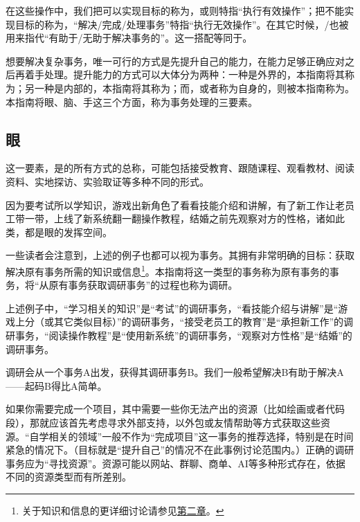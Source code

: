在这些操作中，我们把可以实现目标的称为，或则特指“执行有效操作”；把不能实现目标的称为，“解决/完成/处理事务”特指“执行无效操作”。在其它时候，/也被用来指代“有助于/无助于解决事务的”。这一搭配等同于。

想要解决复杂事务，唯一可行的方式是先提升自己的能力，在能力足够正确应对之后再着手处理。提升能力的方式可以大体分为两种：一种是外界的，本指南将其称为；另一种是内部的，本指南将其称为；而，或者称为自身的，则被本指南称为。本指南将眼、脑、手这三个方面，称为事务处理的三要素。

\subsection{眼}
这一要素，是的所有方式的总称，可能包括接受教育、跟随课程、观看教材、阅读资料、实地探访、实验取证等多种不同的形式。
\begin{examples}
因为要考试所以学知识，游戏出新角色了看看技能介绍和讲解，有了新工作让老员工带一带，上线了新系统翻一翻操作教程，结婚之前先观察对方的性格，诸如此类，都是眼的发挥空间。
\end{examples}
一些读者会注意到，上述的例子也都可以视为事务。其拥有非常明确的目标：获取解决原有事务所需的知识或信息\footnote{关于知识和信息的更详细讨论请参见\hyperref[sec:知识与信息]{第二章}。}。本指南将这一类型的事务称为原有事务的事务，将“从原有事务获取调研事务”的过程也称为调研。
\begin{examples}
上述例子中，“学习相关的知识”是“考试”的调研事务，“看技能介绍与讲解”是“游戏上分（或其它类似目标）”的调研事务，“接受老员工的教育”是“承担新工作”的调研事务，“阅读操作教程”是“使用新系统”的调研事务，“观察对方性格”是“结婚”的调研事务。
\end{examples}
调研会从一个事务A出发，获得其调研事务B。我们一般希望解决B有助于解决A——起码B得比A简单。

\begin{examples}
如果你需要完成一个项目，其中需要一些你无法产出的资源（比如绘画或者代码段），那就应该首先考虑寻求外部支持，以外包或友情帮助等方式获取这些资源。“自学相关的领域”一般不作为“完成项目”这一事务的推荐选择，特别是在时间紧急的情况下。（目标就是“提升自己”的情况不在此事例讨论范围内。）正确的调研事务应为“寻找资源”。资源可能以网站、群聊、商单、AI等多种形式存在，依据不同的资源类型而有所差别。
\end{examples}
